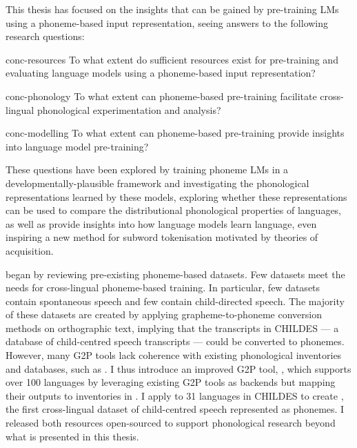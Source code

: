 This thesis has focused on the insights that can be gained by pre-training LMs using a phoneme-based input representation, seeing answers to the following research questions:

\begin{question}{}{conc-resources}
    To what extent do sufficient resources exist for pre-training and evaluating language models using a phoneme-based input representation?
\end{question}

\begin{question}{}{conc-phonology}
    To what extent can phoneme-based pre-training facilitate cross-lingual phonological experimentation and analysis?
\end{question}

\begin{question}{}{conc-modelling}
    To what extent can phoneme-based pre-training provide insights into language model pre-training?
\end{question}

These questions have been explored by training phoneme LMs in a developmentally-plausible framework and investigating the phonological representations learned by these models, exploring whether these representations can be used to compare the distributional phonological properties of languages, as well as provide insights into how language models learn language, even inspiring a new method for subword tokenisation motivated by theories of acquisition.

 began by reviewing pre-existing phoneme-based datasets. Few datasets meet the needs for cross-lingual phoneme-based training. In particular, few datasets contain spontaneous speech and few contain child-directed speech. The majority of these datasets are created by applying grapheme-to-phoneme conversion methods on orthographic text, implying that the transcripts in CHILDES --- a database of child-centred speech transcripts --- could be converted to phonemes. However, many G2P tools lack coherence with existing phonological inventories and databases, such as \phoible. I thus introduce an improved G2P tool, \gpp, which supports over 100 languages by leveraging existing G2P tools as backends but mapping their outputs to inventories in \phoible. I apply \gpp to 31 languages in CHILDES to create \ipachildes, the first cross-lingual dataset of child-centred speech represented as phonemes. I released both resources open-sourced to support phonological research beyond what is presented in this thesis.

